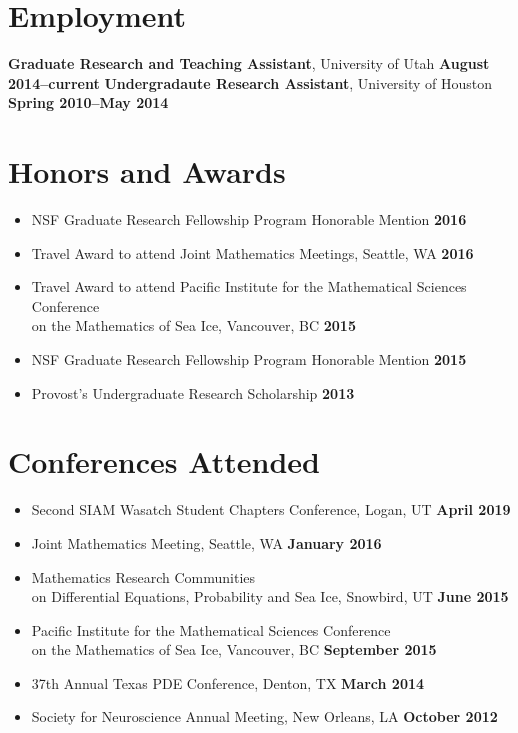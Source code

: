\documentclass[margin,line]{res}
\begin{document}
\begin{resume}
\section{\sc Employment}
{\bf Graduate Research and Teaching Assistant}, University of Utah \hfill {\bf August 2014--current}
{\bf Undergradaute Research Assistant}, University of Houston \hfill {\bf Spring 2010--May 2014}

\section{\sc Honors and Awards}
\begin{itemize}
    \item[] NSF Graduate Research Fellowship Program Honorable Mention \hfill {\bf 2016}
    \item[] Travel Award to attend Joint Mathematics Meetings, Seattle, WA \hfill {\bf 2016}
    \item[] Travel Award to attend Pacific Institute for the Mathematical Sciences Conference\\ on the Mathematics of Sea Ice, Vancouver, BC \hfill {\bf 2015}
    \item[] NSF Graduate Research Fellowship Program Honorable Mention \hfill {\bf 2015}
    \item[] Provost's Undergraduate Research Scholarship \hfill {\bf 2013}
\end{itemize}
\ifx\nopubs\undefined

\else
\fi

\section{\sc Conferences Attended}
\begin{itemize}
\item[] Second SIAM Wasatch Student Chapters Conference, Logan, UT
\hfill {\bf April 2019}
\item[] Joint Mathematics Meeting, Seattle, WA
\hfill {\bf January 2016}
\item[] Mathematics Research Communities \\ on Differential Equations, Probability and Sea Ice, Snowbird, UT
 \hfill {\bf June 2015}
\item[] Pacific Institute for the Mathematical Sciences Conference \\ on the Mathematics of Sea Ice, Vancouver, BC
  \hfill {\bf September 2015}
\item[] 37th Annual Texas PDE Conference, Denton, TX
\hfill {\bf March 2014}
\item[] Society for Neuroscience Annual Meeting, New Orleans, LA
\hfill {\bf October 2012}
\end{itemize}


\end{resume}
\end{document}
